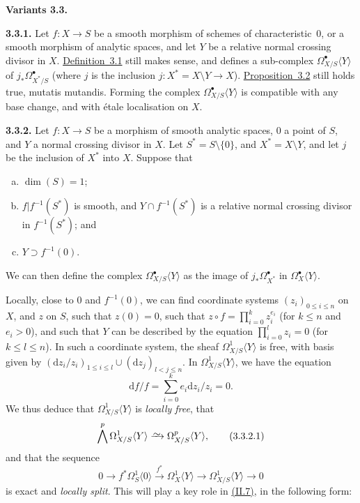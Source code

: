 \documentclass{report}
\newenvironment{rmenv}[1]
  {\phantomsection\par\medskip\noindent\textbf{#1.}\rmfamily}
  {\medskip}
\newcommand{\dd}{\mathrm{d}}
\newcommand{\simto}{\xrightarrow{\raisebox{-0.7ex}[0ex][0ex]{$\sim$}}}
\renewcommand{\leq}{\leqslant}
\newcommand{\oldpage}[1]{\marginpar{\footnotesize$\Big\vert$ \textit{p.~#1}}}
\begin{document}
\begin{rmenv}{Variants 3.3}
\label{II.3.3}
  \begin{rmenv}{3.3.1}
  \label{II.3.3.1}
    Let $f\colon X\to S$ be a smooth morphism of schemes of characteristic~$0$, or a smooth morphism of analytic spaces, and let $Y$ be a relative normal crossing divisor in $X$.
    \hyperref[II.3.1]{Definition~3.1} still makes sense, and defines a sub-complex $\Omega_{X/S}^\bullet\langle Y\rangle$ of $j_*\Omega_{X^*/S}^\bullet$ (where $j$ is the inclusion $j\colon X^*=X\setminus Y\to X$).
    \hyperref[II.3.2]{Proposition~3.2} still holds true, mutatis mutandis.
    Forming the complex $\Omega_{X/S}^\bullet\langle Y\rangle$ is compatible with any base change, and with \'{e}tale localisation on $X$.
  \end{rmenv}

  \begin{rmenv}{3.3.2}
  \label{II.3.3.2}
    Let $f\colon X\to S$ be a morphism of smooth analytic spaces, $0$ a point of $S$, and $Y$ a normal crossing divisor in $X$.
    Let $S^*=S\setminus\{0\}$, and $X^*=X\setminus Y$, and let $j$ be the inclusion of $X^*$ into $X$.
    Suppose that
    \begin{enumerate}[(a)]
      \item $\dim(S)=1$;
      \item $f|f^{-1}(S^*)$ is smooth, and $Y\cap f^{-1}(S^*)$ is a relative normal crossing divisor in $f^{-1}(S^*)$; and
      \item $Y\supset f^{-1}(0)$.
    \end{enumerate}

    We can then define the complex $\Omega_{X/S}^\bullet\langle Y\rangle$ as the image of $j_*\Omega_{X^*}^\bullet$ in $\Omega_X^\bullet\langle Y\rangle$.

    Locally, close to $0$ and $f^{-1}(0)$, we can find coordinate systems $(z_i)_{0\leq i\leq n}$ on $X$, and $z$ on $S$, such that $z(0)=0$, such that $z\circ f = \prod_{i=0}^k z_i^{e_i}$ (for $k\leq n$ and $e_i>0$), and such that $Y$ can be described by the equation $\prod_{i=0}^l z_i=0$ (for $k\leq l\leq n$).
    In such a coordinate system, the sheaf $\Omega_{X/S}^1\langle Y\rangle$ is free, with basis given by $(\dd z_i/z_i)_{1\leq i\leq l}\cup(\dd z_j)_{l<j\leq n}$.
    In $\Omega_{X/S}^1\langle Y\rangle$, we have the equation
    \[
      \dd f/f = \sum_{i=0}^k e_i\dd z_i/z_i = 0.
    \]
    We thus deduce that $\Omega_{X/S}^1\langle Y\rangle$ is \emph{locally free}, that
    \[
    \label{II.3.3.2.1}
      \bigwedge^p \Omega_{X/S}^1\langle Y\rangle
      \simto \Omega_{X/S}^p\langle Y\rangle,
    \tag{3.3.2.1}
    \]
    and that the sequence
  \oldpage{75}
    \[
    \label{II.3.3.2.2}
      0
      \to f^*\Omega_S^1\langle0\rangle
      \xrightarrow{f^*} \Omega_X^1\langle Y\rangle
      \to \Omega_{X/S}^1\langle Y\rangle
      \to 0
    \tag{3.3.2.2}
    \]
    is exact and \emph{locally split}.
    This will play a key role in \hyperref[II.7]{(II.7)}, in the following form:


\end{rmenv}
\end{rmenv}
\end{document}
